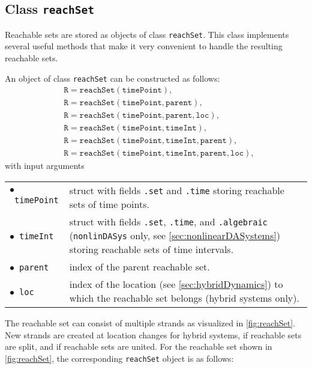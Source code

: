 \subsection{Class \texttt{reachSet}}
\label{sec:reachSet}

Reachable sets are stored as objects of class \texttt{reachSet}. This class implements several useful methods that make it very convenient to handle the resulting reachable sets.

An object of class \texttt{reachSet} can be constructed as follows:
\begin{equation*}
	\begin{split}
		& \texttt{R} = \texttt{reachSet}(\texttt{timePoint}), \\
		& \texttt{R} = \texttt{reachSet}(\texttt{timePoint},\texttt{parent}), \\
		& \texttt{R} = \texttt{reachSet}(\texttt{timePoint},\texttt{parent},\texttt{loc}), \\
		& \texttt{R} = \texttt{reachSet}(\texttt{timePoint},\texttt{timeInt}), \\
		& \texttt{R} = \texttt{reachSet}(\texttt{timePoint},\texttt{timeInt},\texttt{parent}), \\
		& \texttt{R} = \texttt{reachSet}(\texttt{timePoint},\texttt{timeInt},\texttt{parent},\texttt{loc}),
	\end{split}
\end{equation*}	
with input arguments
\begin{center}
\renewcommand{\arraystretch}{1.3}
\begin{tabular}[t]{l p{12cm} }
	$\bullet$~\texttt{timePoint} & struct with fields \texttt{.set} and \texttt{.time} storing reachable sets of time points.\\
	$\bullet$~\texttt{timeInt} & struct with fields \texttt{.set}, \texttt{.time}, and \texttt{.algebraic} (\texttt{nonlinDASys} only, see \cref{sec:nonlinearDASystems}) storing reachable sets of time intervals. \\
	$\bullet$~\texttt{parent} & index of the parent reachable set. \\
	$\bullet$~\texttt{loc} & index of the location (see \cref{sec:hybridDynamics}) to which the reachable set belongs (hybrid systems only).
\end{tabular}
\end{center}

The reachable set can consist of multiple strands as visualized in \cref{fig:reachSet}. New strands are created at location changes for hybrid systems, if reachable sets are split, and if reachable sets are united. For the reachable set shown in \cref{fig:reachSet}, the corresponding \texttt{reachSet} object is as follows:

